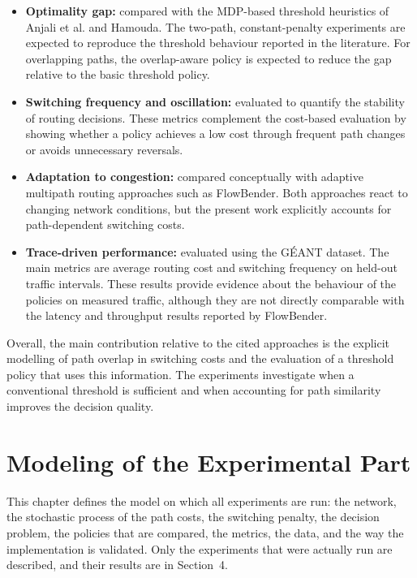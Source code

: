 \documentclass{amsart}
\begin{document}
\begin{itemize}
    \item \textbf{Optimality gap:} compared with the MDP-based threshold heuristics of Anjali et al. and Hamouda. The two-path, constant-penalty experiments are expected to reproduce the threshold behaviour reported in the literature. For overlapping paths, the overlap-aware policy is expected to reduce the gap relative to the basic threshold policy.
    
    \item \textbf{Switching frequency and oscillation:} evaluated to quantify the stability of routing decisions. These metrics complement the cost-based evaluation by showing whether a policy achieves a low cost through frequent path changes or avoids unnecessary reversals.
    
    \item \textbf{Adaptation to congestion:} compared conceptually with adaptive multipath routing approaches such as FlowBender. Both approaches react to changing network conditions, but the present work explicitly accounts for path-dependent switching costs.
    
    \item \textbf{Trace-driven performance:} evaluated using the GÉANT dataset. The main metrics are average routing cost and switching frequency on held-out traffic intervals. These results provide evidence about the behaviour of the policies on measured traffic, although they are not directly comparable with the latency and throughput results reported by FlowBender.
\end{itemize}

Overall, the main contribution relative to the cited approaches is the explicit modelling of path overlap in switching costs and the evaluation of a threshold policy that uses this information. The experiments investigate when a conventional threshold is sufficient and when accounting for path similarity improves the decision quality.

\section{Modeling of the Experimental Part}
\label{sec:model}

This chapter defines the model on which all experiments are run: the network, the stochastic process of the path costs, the switching penalty, the decision problem, the policies that are compared, the metrics, the data, and the way the implementation is validated. Only the experiments that were actually run are described, and their results are in Section~4.
\end{document}
